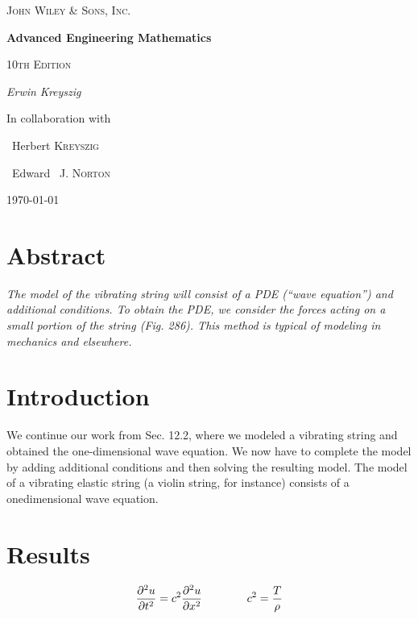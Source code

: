 \documentclass[12pt, a4paper, reqno]{amsart}
\begin{document}
\begin{titlepage}
	\centering
    {\scshape\LARGE John Wiley \& Sons, Inc.\par}
	\vspace{1cm}
	{\huge\bfseries Advanced Engineering Mathematics\par}
	\vspace{2cm}
	{\scshape\Large 10th Edition\par}
	\vspace{1.5cm}
	{\Large\itshape Erwin Kreyszig\par}
	\vfill
	In collaboration with\par
    ~Herbert \textsc{Kreyszig}\par
    ~Edward ~J. \textsc{Norton}

	\vfill

	{\large \today\par}
\end{titlepage}

\renewcommand{\abstractname}{3 Line Abstract}

\section*{Abstract}
\textit{The model of the vibrating string will consist of a PDE 
(“wave equation”) and 
additional conditions. To obtain the PDE, we consider the forces acting on a 
small portion of the string (Fig. 286). This method is typical of modeling in 
mechanics and elsewhere.}

\tableofcontents

\section{Introduction}

We continue our work from Sec. 12.2, where we modeled a vibrating string and obtained
the one-dimensional wave equation. We now have to complete the model by adding
additional conditions and then solving the resulting model.
The model of a vibrating elastic string (a violin string, for instance)
consists of a onedimensional wave equation.

\section{Results}

\begin{equation}
    \frac{\partial^2{u}}{\partial{t^2}} = c^2\frac{\partial^2{u} \\
    }{\partial{x^2}} \qquad \qquad c^2 = \frac{T}{\rho}
\end{equation}
\end{document}
